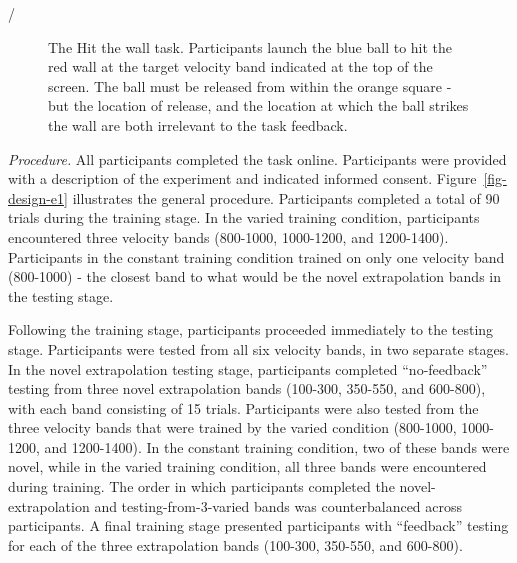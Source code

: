 \documentclass[
  12pt,
  letterpaper,
]{article}
\begin{document}
/

\begin{figure}


\caption{\label{fig-htw-task}The Hit the wall task. Participants launch
the blue ball to hit the red wall at the target velocity band indicated
at the top of the screen. The ball must be released from within the
orange square - but the location of release, and the location at which
the ball strikes the wall are both irrelevant to the task feedback.}

\end{figure}%

\emph{Procedure.} All participants completed the task online.
Participants were provided with a description of the experiment and
indicated informed consent. Figure~\ref{fig-design-e1} illustrates the
general procedure. Participants completed a total of 90 trials during
the training stage. In the varied training condition, participants
encountered three velocity bands (800-1000, 1000-1200, and 1200-1400).
Participants in the constant training condition trained on only one
velocity band (800-1000) - the closest band to what would be the novel
extrapolation bands in the testing stage.

Following the training stage, participants proceeded immediately to the
testing stage. Participants were tested from all six velocity bands, in
two separate stages. In the novel extrapolation testing stage,
participants completed ``no-feedback'' testing from three novel
extrapolation bands (100-300, 350-550, and 600-800), with each band
consisting of 15 trials. Participants were also tested from the three
velocity bands that were trained by the varied condition (800-1000,
1000-1200, and 1200-1400). In the constant training condition, two of
these bands were novel, while in the varied training condition, all
three bands were encountered during training. The order in which
participants completed the novel-extrapolation and testing-from-3-varied
bands was counterbalanced across participants. A final training stage
presented participants with ``feedback'' testing for each of the three
extrapolation bands (100-300, 350-550, and 600-800).
\end{document}
